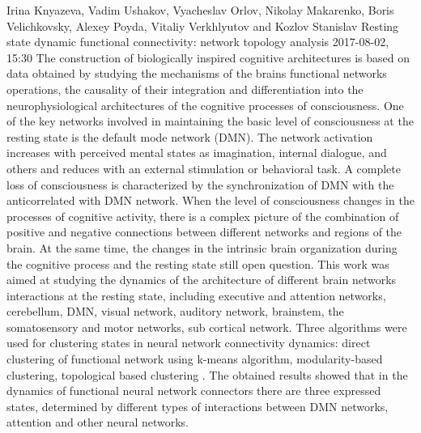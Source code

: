 \documentclass[10pt,fleqn,openany]{book} %
\begin{document}
\begin{enumerate}
		
		\paperabstract
		{Irina Knyazeva, Vadim Ushakov, Vyacheslav Orlov, Nikolay Makarenko, Boris Velichkovsky, Alexey Poyda, Vitaliy Verkhlyutov and Kozlov Stanislav}
		{Resting state dynamic functional connectivity: network topology analysis}
		{2017-08-02, 15:30}
		{The construction of biologically inspired cognitive architectures is based on data obtained by studying the mechanisms of the brains functional networks operations, the causality of their integration and differentiation into the neurophysiological architectures of the cognitive processes of consciousness. One of the key networks involved in maintaining the basic level of consciousness at the resting state is the default mode network (DMN). The network activation increases with perceived mental states as imagination, internal dialogue, and others and  reduces  with an external stimulation or behavioral task. A complete loss of consciousness is characterized by the synchronization of DMN with the anticorrelated with DMN network. When the level of consciousness changes in the processes of cognitive activity, there is a complex picture of the combination of positive and negative connections between different networks and regions of the brain. At the same time, the changes in the intrinsic brain organization during the cognitive process and the resting state still open question. This work was aimed at studying the dynamics of the architecture of different brain networks interactions at the resting state, including executive and attention networks, cerebellum, DMN, visual network, auditory network, brainstem, the somatosensory and motor networks, sub cortical network. Three algorithms were used for clustering states in neural network connectivity dynamics: direct clustering of functional network using k-means algorithm, modularity-based clustering, topological based clustering . The obtained results showed that in the dynamics of functional neural network connectors there are three expressed states, determined by different types of interactions between DMN networks, attention and other neural networks.}
		

\end{enumerate}
\end{document}
